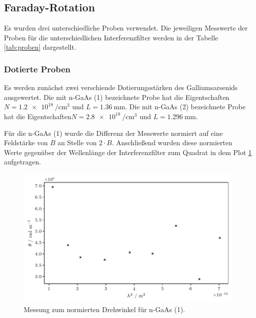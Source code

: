 \subsection{Faraday-Rotation}

Es wurden drei unterschiedliche Proben verwendet. Die jeweiligen Messwerte der Proben für die unterschiedlichen Interferenzfilter werden
in der Tabelle \ref{tab:proben} dargestellt.

\begin{table}[H]
	\centering
	\caption{}
	
	\label{tab:proben}
\end{table}

\subsubsection{Dotierte Proben}
\label{sec:Dotierte}

Es werden zunächst zwei verschiende Dotierungsstärken des Galliumsarsenids ausgewertet. Die mit n-GaAs (1) bezeichnete
Probe hat die Eigentschaften $N = \qty{1.2e18}{\per\centi\meter\cubed}$ und $L = \qty{1.36}{\milli\meter}$. Die mit n-GaAs (2)
bezeichnete Probe hat die Eigentschaften$N = \qty{2.8e18}{\per\centi\meter\cubed}$ und $L = \qty{1.296}{\milli\meter}$.

Für die n-GaAs (1) wurde die Differenz der Messwerte normiert auf eine Feldstärke von $B$ an Stelle von $2 \cdot B$.
Anschließend wurden diese normierten Werte gegenüber der Wellenlänge der Interferenzfilter zum Quadrat in dem Plot \ref{fig:dotiert-1} aufgetragen.

\begin{figure}[H]
    \centering
    \includegraphics{build/doped-1.pdf}
    \caption{Messung zum normierten Drehwinkel für n-GaAs (1).}
    \label{fig:dotiert-1}
\end{figure}

